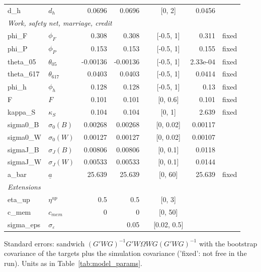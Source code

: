 \begin{table}[htbp]
\begin{tabular}{llrrrcrr}
d\_h & $d_h$ & 0.0696 & 0.0696 &  & [0, 2] & 0.0456 &  \\
\multicolumn{8}{l}{\textit{Work, safety net, marriage, credit}} \\
phi\_F & $\phi_F$ & 0.308 & 0.308 &  & [-0.5, 1] & 0.311 & fixed \\
phi\_P & $\phi_P$ & 0.153 & 0.153 &  & [-0.5, 1] & 0.155 & fixed \\
theta\_05 & $\theta_{05}$ & -0.00136 & -0.00136 &  & [-0.5, 1] & 2.33e-04 & fixed \\
theta\_617 & $\theta_{617}$ & 0.0403 & 0.0403 &  & [-0.5, 1] & 0.0414 & fixed \\
phi\_h & $\phi_h$ & 0.128 & 0.128 &  & [-0.5, 1] & 0.13 & fixed \\
F & $F$ & 0.101 & 0.101 &  & [0, 0.6] & 0.101 & fixed \\
kappa\_S & $\kappa_S$ & 0.104 & 0.104 &  & [0, 1] & 2.639 & fixed \\
sigma0\_B & $\sigma_0(B)$ & 0.00268 & 0.00268 &  & [0, 0.02] & 0.00117 &  \\
sigma0\_W & $\sigma_0(W)$ & 0.00127 & 0.00127 &  & [0, 0.02] & 0.00107 &  \\
sigmaJ\_B & $\sigma_J(B)$ & 0.00806 & 0.00806 &  & [0, 0.1] & 0.0118 &  \\
sigmaJ\_W & $\sigma_J(W)$ & 0.00533 & 0.00533 &  & [0, 0.1] & 0.0144 &  \\
a\_bar & $\underline a$ & 25.639 & 25.639 &  & [0, 60] & 25.639 & fixed \\
\multicolumn{8}{l}{\textit{Extensions}} \\
eta\_up & $\eta^{up}$ & 0.5 & 0.5 &  & [0, 3] &  &  \\
c\_mem & $c_{mem}$ & 0 & 0 &  & [0, 50] &  &  \\
sigma\_eps & $\sigma_\varepsilon$ &  & 0.05 &  & [0.02, 0.5] &  &  \\
\bottomrule
\end{tabular}
\begin{minipage}{0.95\textwidth}\footnotesize Standard errors: sandwich $(G'WG)^{-1}G'W\Omega WG(G'WG)^{-1}$ with the bootstrap covariance of the targets plus the simulation covariance ('fixed': not free in the run). Units as in Table~\ref{tab:model_params}.\end{minipage}
\end{table}
